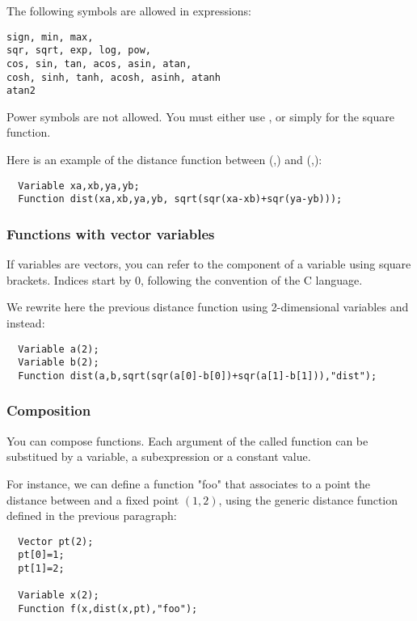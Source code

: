 The following symbols are allowed in expressions:
\begin{verbatim}
sign, min, max,
sqr, sqrt, exp, log, pow, 
cos, sin, tan, acos, asin, atan,
cosh, sinh, tanh, acosh, asinh, atanh
atan2
\end{verbatim}

Power symbols \cf{^} are not allowed. You must
either use , or simply  for the square function.

Here is an example of the distance function between (,) and
(,):

\begin{lstlisting}
  Variable xa,xb,ya,yb;
  Function dist(xa,xb,ya,yb, sqrt(sqr(xa-xb)+sqr(ya-yb)));
\end{lstlisting}

\subsubsection{Functions with vector variables}

If variables are vectors, you can refer to the component
of a variable using square brackets. Indices start by 0,
following the convention of the C language.

We rewrite here the previous distance function using 2-dimensional
variables  and  instead:
\begin{lstlisting}
  Variable a(2);
  Variable b(2);
  Function dist(a,b,sqrt(sqr(a[0]-b[0])+sqr(a[1]-b[1])),"dist");
\end{lstlisting}

\subsubsection{Composition}

You can compose functions. Each argument of the called function can be substitued
by a variable, a subexpression or a constant value.

For instance, we can define a function "foo" that associates to
a point  the distance between  and a fixed point $(1,2)$,
using the generic distance function defined in the previous paragraph:

\begin{lstlisting}
  Vector pt(2);
  pt[0]=1;
  pt[1]=2;

  Variable x(2);
  Function f(x,dist(x,pt),"foo");
\end{lstlisting}

